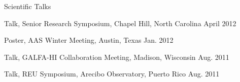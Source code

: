 \documentclass{resume_clark} %
\begin{document}
\begin{rSection}{Scientific Talks}
\begin{etaremune}[itemsep=-1.8mm]
\item Talk, Senior Research Symposium, Chapel Hill, North Carolina \hfill {April 2012}

\item Poster, AAS Winter Meeting, Austin, Texas \hfill {Jan. 2012}

\item Talk, GALFA-HI Collaboration Meeting, Madison, Wisconsin \hfill {Aug. 2011}

\item Talk, REU Symposium, Arecibo Observatory, Puerto Rico \hfill {Aug. 2011}

\end{etaremune}



\end{rSection}




\end{document}

